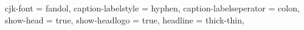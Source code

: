 {{      %
    cjk-font = fandol,
    caption-labelstyle = hyphen,
    caption-labelseperator = colon,
    show-head = true,
    show-headlogo = true,
    headline = thick-thin,
}}
